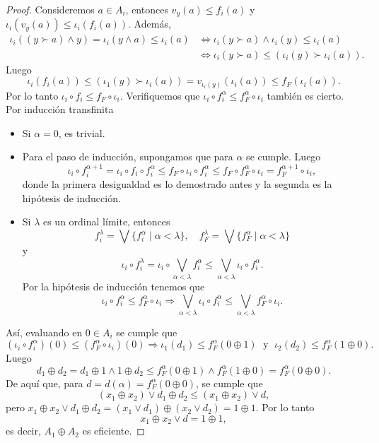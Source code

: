 \documentclass[11pt]{amsart}
\theoremstyle{plain}
\theoremstyle{definition}
\begin{document}
\begin{proof}
Consideremos $a\in A_i$, entonces $v_y(a)\leq f_i(a)$ y $\iota_i(v_y(a))\leq \iota_i(f_i(a))$. Además,
\[
\begin{split}
\iota_i((y\succ a)\wedge y)=\iota_i(y\wedge a)\leq \iota_i(a)& \Leftrightarrow \iota_i(y\succ a)\wedge \iota_i(y)\leq \iota_i(a)\\
& \Leftrightarrow \iota_i(y\succ a)\leq (\iota_i(y)\succ \iota_i(a)).
\end{split}
\]
Luego 
\[
\iota_i(f_i(a))\leq (\iota_1(y)\succ \iota_i(a))=v_{\iota_i(y)}(\iota_i(a))\leq f_F(\iota_i(a)).
\]
Por lo tanto $\iota_i\circ f_i\leq f_F\circ \iota_i$. Verifiquemos que $\iota_i\circ f_i^\alpha\leq f_F^\alpha\circ \iota_i$ también es cierto. Por inducción transfinita 
\begin{itemize}
\item Si $\alpha=0$, es trivial.
\item Para el paso de inducción, supongamos que para $\alpha$ se cumple. Luego
\[
\iota_i\circ f_i^{\alpha+1}=\iota_i\circ f_i\circ f_i^{\alpha}\leq  f_F\circ \iota_i\circ f_i^\alpha\leq f_F\circ f^\alpha_F\circ \iota_i=f^{\alpha+1}_F\circ \iota_i,
\]
donde la primera desigualdad es lo demostrado antes y la segunda es la hipótesis de inducción.
\item Si $\lambda$ es un ordinal límite, entonces
\[
f_i^\lambda=\bigvee\{f_i^\alpha\mid \alpha<\lambda\}, \quad f^\lambda_F=\bigvee\{f^\alpha_F\mid \alpha<\lambda\}
\]
y
\[  
\iota_i\circ f_i^\lambda=\iota_i\circ \bigvee_{\alpha<\lambda}f_i^\alpha\leq\bigvee_{\alpha<\lambda}\iota_i\circ f_i^\alpha.
\]
Por la hipótesis de inducción tenemos que
\[
\iota_i\circ f_i^\alpha\leq f_F^\alpha\circ \iota_i\Rightarrow \bigvee_{\alpha<\lambda}\iota_i\circ f_i^\alpha\leq \bigvee_{\alpha<\lambda} f_F^\alpha\circ \iota_i.
\]
\end{itemize}
Así, evaluando en $0\in A_i$ se cumple que
\[
(\iota_i\circ f_i^\alpha)(0)\leq (f^\alpha_F\circ \iota_i)(0)\Rightarrow \iota_1(d_1)\leq f^\alpha_F(0\oplus 1)\;\mbox{ y }\;\iota_2(d_2)\leq f^\alpha_F(1\oplus 0).
\]
Luego 
\[
d_1\oplus d_2=d_1\oplus 1\wedge 1\oplus d_2\leq f^\alpha_F(0\oplus 1)\wedge f^\alpha_F(1\oplus 0)=f^\alpha_F(0\oplus 0). 
\]
De aquí que, para $d=d(\alpha)=f^\alpha_F(0\oplus 0)$, se cumple que
\[
(x_1\oplus x_2)\vee d_1\oplus d_2\leq (x_1\oplus x_2)\vee d,
\]
pero $x_1\oplus x_2\vee d_1\oplus d_2=(x_1\vee d_1)\oplus (x_2\vee d_2)=1\oplus 1$. Por lo tanto 
\[
x_1\oplus x_2\vee d=1\oplus 1,
\]
es decir, $A_1\oplus A_2$ es eficiente.
\end{proof}
\end{document}
